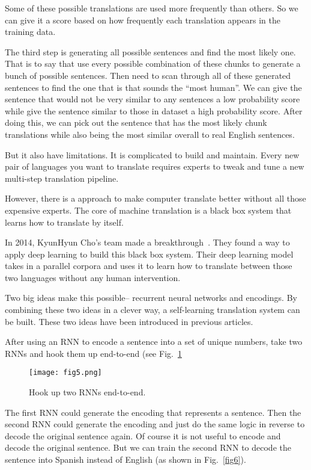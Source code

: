 \documentclass[10pt,twocolumn,letterpaper]{article}
\begin{document}
	\par
	Some of these possible translations are used more frequently than others. So we can give it a score based on how frequently each translation appears in the training data.
	\par
	The third step is generating all possible sentences and find the most likely one. That is to say that use every possible combination of these chunks to generate a bunch of possible sentences. Then need to scan through all of these generated sentences to find the one that is that sounds the ``most human''. We can give the sentence that would not be very similar to any sentences a low probability score while give the sentence similar to those in dataset a high probability score. After doing this, we can pick out the sentence that has the most likely chunk translations while also being the most similar overall to real English sentences.
	\par
	But it also have limitations. It is complicated to build and maintain. Every new pair of languages you want to translate requires experts to tweak and tune a new multi-step translation pipeline.
	\par
	However, there is a approach to make computer translate better without all those expensive experts. The core of machine translation is a black box system that learns how to translate by itself.
	\par
	In 2014, KyunHyun Cho's team made a breakthrough~\cite{KyunHyun}. They found a way to apply deep learning to build this black box system. Their deep learning model takes in a parallel corpora and uses it to learn how to translate between those two languages without any human intervention.
	\par
	Two big ideas make this possible-- recurrent neural networks and encodings. By combining these two ideas in a clever way, a self-learning translation system can be built. These two ideas have been introduced in previous articles.
	\par
	After using an RNN to encode a sentence into a set of unique numbers, take two RNNs and hook them up end-to-end (see Fig.~\ref{fig5}
	\begin{figure}[h]
		\centering
		\texttt{[image: fig5.png]}
		\caption{Hook up two RNNs end-to-end.} \label{fig5}
	\end{figure} 
	\par
	The first RNN could generate the encoding that represents a sentence. Then the second RNN could generate the encoding and just do the same logic in reverse to decode the original sentence again. Of course it is not useful to encode and decode the original sentence. But we can train the second RNN to decode the sentence into Spanish instead of English (as shown in Fig.~\ref{fig6}).
\end{document}
